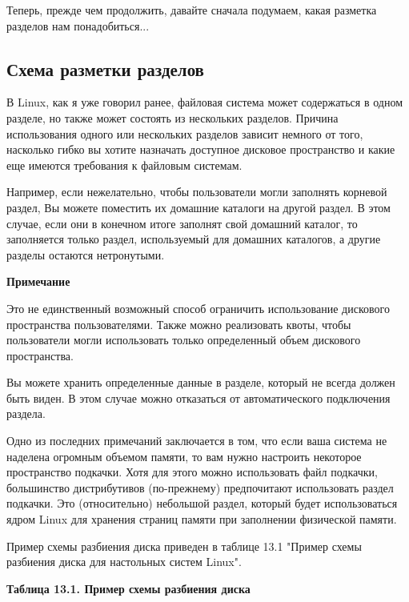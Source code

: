 \documentclass[10pt]{book}
\begin{document}
Теперь, прежде чем продолжить, давайте сначала подумаем, какая разметка разделов нам понадобиться...

\subsection{Схема разметки разделов}
В Linux, как я уже говорил ранее, файловая система может содержаться в одном разделе, но также может состоять из нескольких разделов. Причина использования одного или нескольких разделов зависит немного от того, насколько гибко вы хотите назначать доступное дисковое пространство и какие еще имеются требования к файловым системам.

Например, если нежелательно, чтобы пользователи могли заполнять корневой раздел, Вы можете поместить их домашние каталоги на другой раздел. В этом случае, если они в конечном итоге заполнят свой домашний каталог, то заполняется только раздел, используемый для домашних каталогов, а другие разделы остаются нетронутыми.

{\scriptsize{\textbf{Примечание}

Это не единственный возможный способ ограничить использование дискового пространства пользователями. Также можно реализовать квоты, чтобы пользователи могли использовать только определенный объем дискового пространства.
}}

Вы можете хранить определенные данные в разделе, который не всегда должен быть виден. В этом случае можно отказаться от автоматического подключения раздела.

Одно из последних примечаний заключается в том, что если ваша система не наделена огромным объемом памяти, то вам нужно настроить некоторое пространство подкачки. Хотя для этого можно использовать файл подкачки, большинство дистрибутивов (по-прежнему) предпочитают использовать раздел подкачки. Это (относительно) небольшой раздел, который будет использоваться ядром Linux для хранения страниц памяти при заполнении физической памяти.

Пример схемы разбиения диска приведен в таблице 13.1 "Пример схемы разбиения диска для настольных систем Linux".

\textbf{Таблица 13.1. Пример схемы разбиения диска}
\end{document}
